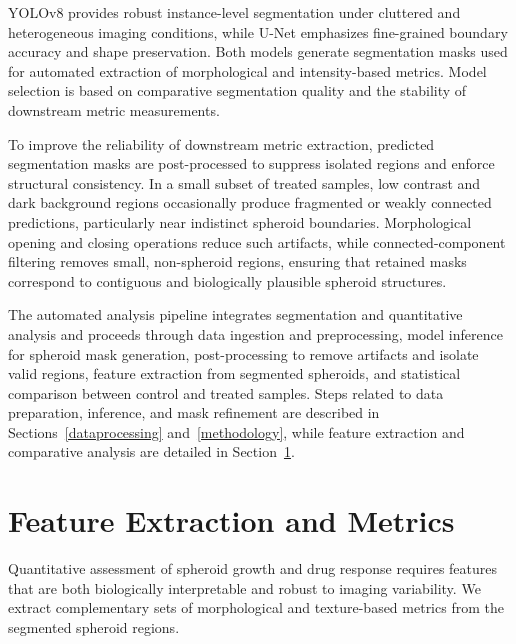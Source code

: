 \documentclass[sigconf, nonacm]{acmart}
\begin{document}
YOLOv8 provides robust instance-level segmentation under cluttered and heterogeneous imaging conditions, while U-Net emphasizes fine-grained boundary accuracy and shape preservation. Both models generate segmentation masks used for automated extraction of morphological and intensity-based metrics. Model selection is based on comparative segmentation quality and the stability of downstream metric measurements.

To improve the reliability of downstream metric extraction, predicted segmentation masks are post-processed to suppress isolated regions and enforce structural consistency. In a small subset of treated samples, low contrast and dark background regions occasionally produce fragmented or weakly connected predictions, particularly near indistinct spheroid boundaries. Morphological opening and closing operations reduce such artifacts, while connected-component filtering removes small, non-spheroid regions, ensuring that retained masks correspond to contiguous and biologically plausible spheroid structures.



The automated analysis pipeline integrates segmentation and quantitative analysis and proceeds through data ingestion and preprocessing, model inference for spheroid mask generation, post-processing to remove artifacts and isolate valid regions, feature extraction from segmented spheroids, and statistical comparison between control and treated samples. Steps related to data preparation, inference, and mask refinement are described in Sections~\ref{dataprocessing} and~\ref{methodology}, while feature extraction and comparative analysis are detailed in Section~\ref{metrics}.


\section{Feature Extraction and Metrics}\label{metrics}
Quantitative assessment of spheroid growth and drug response requires features that are both biologically interpretable and robust to imaging variability. We extract complementary sets of morphological and texture-based metrics from the segmented spheroid regions. %
\end{document}
